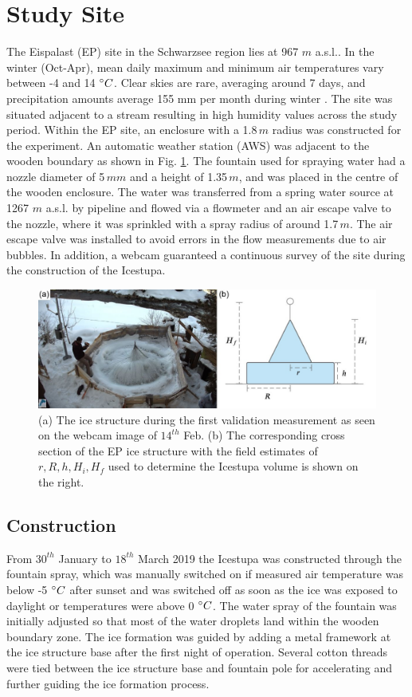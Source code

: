 \documentclass[utf8]{frontiersSCNS} %
\begin{document}
\section{Study Site}
The Eispalast (EP) site in the Schwarzsee region lies at 967 $m$ a.s.l.. In the winter (Oct-Apr), mean daily maximum
and minimum air temperatures vary between -4 and 14 $\degree C$. Clear skies are rare, averaging around 7 days, and
precipitation amounts average 155 mm per month during winter \citep{eispalast}. The site was situated adjacent to a
stream resulting in high humidity values across the study period. Within the EP site, an enclosure with a 1.8\,$m$
radius was constructed for the experiment. An automatic weather station (AWS) was adjacent to the wooden
boundary as shown in Fig. \ref{fig:site}. The fountain used for spraying water had a nozzle diameter of 5\,$mm$ and a
height of 1.35\,$m$, and was placed in the centre of the wooden enclosure. The water was transferred from a spring
water source at 1267 $m$ a.s.l. by pipeline and flowed via a flowmeter and an air escape valve to the nozzle, where it
was sprinkled with a spray radius of around 1.7\,$m$. The air escape valve was installed to avoid errors in the flow
measurements due to air bubbles. In addition, a webcam guaranteed a continuous survey of the site during the
construction of the Icestupa. 

\begin{figure} \centering \includegraphics[width=15cm]{./Figures/Figure_2.jpg}
\caption{(a) The ice structure during the first validation measurement as seen on the webcam image of
  $14^{th}$ Feb. (b) The corresponding cross section of the EP ice structure with the field estimates of $r, R,
  h, H_i, H_f$ used to determine the Icestupa volume is shown on the right.} \label{fig:site} \end{figure}

\subsection{Construction} 
From $30^{th}$ January to $18^{th}$ March 2019 the Icestupa was constructed through the fountain spray, which was
manually switched on if measured air temperature was below -5 $\degree C$ after sunset and was switched off as soon as
the ice was exposed to daylight or temperatures were above 0 $\degree C$. The water spray of the fountain was initially
adjusted so that most of the water droplets land within the wooden boundary zone. The ice formation was guided by
adding a metal framework at the ice structure base after the first night of operation.  Several cotton threads were
tied between the ice structure base and fountain pole for accelerating and further guiding the ice formation process. 
\end{document}
